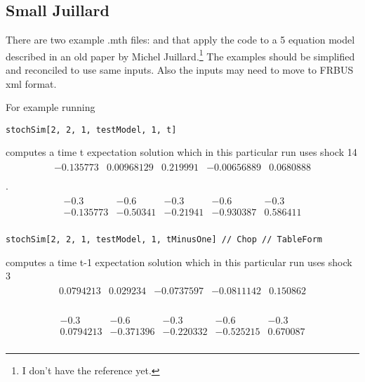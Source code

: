 
\subsection{Small Juillard}
\label{sec:small-juillard}
There are two example .mth files:  and  that apply the code to a 5 equation model described in an old paper by
Michel Juillard.\footnote{I don't have the reference yet.} The examples should
be simplified and reconciled to use same inputs.  Also the inputs may need
to move to FRBUS xml format.



For example running
\begin{verbatim}
stochSim[2, 2, 1, testModel, 1, t]
\end{verbatim}
computes a time t expectation solution which in this particular run uses
shock {14}
\begin{gather*}\begin{array}{ccccc}
 -0.135773 & 0.00968129 & 0.219991 & -0.00656889 & 0.0680888 \\
\end{array}
\end{gather*}
.
\begin{gather*}\begin{array}{ccccc}
 -0.3 & -0.6 & -0.3 & -0.6 & -0.3 \\
 -0.135773 & -0.50341 & -0.21941 & -0.930387 & 0.586411 \\
\end{array}
\end{gather*}

\begin{verbatim}
stochSim[2, 2, 1, testModel, 1, tMinusOne] // Chop // TableForm
\end{verbatim}
computes a time t-1 expectation solution which in this particular run uses
shock {3}
\begin{gather*}\begin{array}{ccccc}
 0.0794213 & 0.029234 & -0.0737597 & -0.0811142 & 0.150862 \\
\end{array}
\end{gather*}

\begin{gather*}\begin{array}{ccccc}
 -0.3 & -0.6 & -0.3 & -0.6 & -0.3 \\
 0.0794213 & -0.371396 & -0.220332 & -0.525215 & 0.670087 \\
\end{array}
\end{gather*}